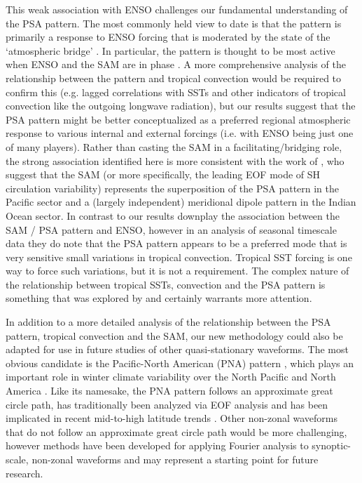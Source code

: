 This weak association with ENSO challenges our fundamental understanding of the PSA pattern. The most commonly held view to date is that the pattern is primarily a response to ENSO forcing \citep[e.g.][]{Mo2001} that is moderated by the state of the `atmospheric bridge' \citep{Liu2007}. In particular, the pattern is thought to be most active when ENSO and the SAM are in phase \citep{Fogt2006}. A more comprehensive analysis of the relationship between the pattern and tropical convection would be required to confirm this (e.g. lagged correlations with SSTs and other indicators of tropical convection like the outgoing longwave radiation), but our results suggest that the PSA pattern might be better conceptualized as a preferred regional atmospheric response to various internal and external forcings (i.e. with ENSO being just one of many players). Rather than casting the SAM in a facilitating/bridging role, the strong association identified here is more consistent with the work of \citet{Ding2012}, who suggest that the SAM (or more specifically, the leading EOF mode of SH circulation variability) represents the superposition of the PSA pattern in the Pacific sector and a (largely independent) meridional dipole pattern in the Indian Ocean sector. In contrast to \citet{Ding2012} our results downplay the association between the SAM / PSA pattern and ENSO, however in an analysis of seasonal timescale data they do note that the PSA pattern appears to be a preferred mode that is very sensitive small variations in tropical convection. Tropical SST forcing is one way to force such variations, but it is not a requirement. The complex nature of the relationship between tropical SSTs, convection and the PSA pattern is something that was explored by \citet{Harangozo2004} and certainly warrants more attention.  

In addition to a more detailed analysis of the relationship between the PSA pattern, tropical convection and the SAM, our new methodology could also be adapted for use in future studies of other quasi-stationary waveforms. The most obvious candidate is the Pacific-North American (PNA) pattern \citep{Wallace1981}, which plays an important role in winter climate variability over the North Pacific and North America \citep[e.g.][]{Notaro2006}. Like its namesake, the PNA pattern follows an approximate great circle path, has traditionally been analyzed via EOF analysis and has been implicated in recent mid-to-high latitude trends \citep[e.g.][]{Ding2014,Liu2015}. Other non-zonal waveforms that do not follow an approximate great circle path would be more challenging, however methods have been developed for applying Fourier analysis to synoptic-scale, non-zonal waveforms \citep{Zimin2006,Souders2014} and may represent a starting point for future research. 
